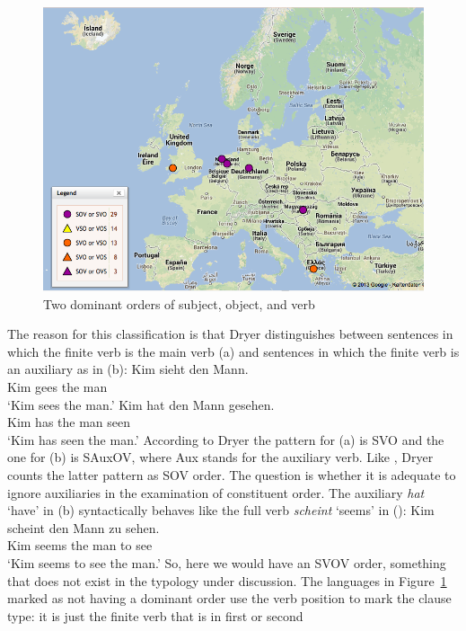 \begin{figure}[htbp]
\includegraphics[width=.898\textwidth]{Pictures/WALS-SOV-Europa-no-dominant}
\caption{\label{fig-sov-wals-europe-two}%
Two dominant orders of subject, object, and verb}
\end{figure}
The reason for this classification is that Dryer distinguishes between sentences in which the finite
verb is the main verb (a) and sentences in which the finite verb is an auxiliary as in (b):
\eal
\ex 
\gll Kim sieht den Mann.\\
     Kim gees the man\\
\glt `Kim sees the man.'
\ex
\gll Kim hat den Mann gesehen.\\
     Kim has the man seen\\
\glt `Kim has seen the man.'
\zl
According to Dryer the pattern for (a) is SVO and the one for (b) is SAuxOV, where Aux
stands for the auxiliary verb. Like
\citet{Greenberg63a-u}, Dryer counts the latter pattern as SOV order. The question is whether it is adequate to ignore auxiliaries
in the examination of constituent order. The auxiliary \emph{hat} `have' in (b) syntactically
behaves like the full verb \emph{scheint} `seems' in ():
\ea
\gll Kim scheint den Mann zu sehen.\\
     Kim seems   the man  to see\\
\glt `Kim seems to see the man.'
\z
So, here we would have an SVOV order, something that does not exist in the typology under discussion.
The languages in Figure~\ref{fig-sov-wals-europe-two} marked as not having a dominant order use the
verb position to mark the clause type: it is just the finite verb that is in first or second
